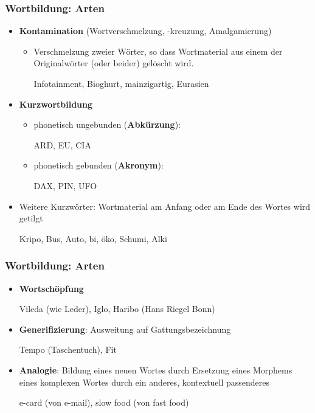 \begin{frame}
\frametitle{Wortbildung: Arten}

\begin{itemize}
	\item \textbf{Kontamination} (Wortverschmelzung, -kreuzung, Amalgamierung)
	
	\begin{itemize}
		\item Verschmelzung zweier Wörter, so dass Wortmaterial aus einem der Originalwörter (oder beider) gelöscht wird.
		
		\ea Infotainment, Bioghurt, mainzigartig, Eurasien
		\z
		
	\end{itemize}
	
	\item \textbf{Kurzwortbildung}
	
	\begin{itemize}
		\item phonetisch ungebunden (\textbf{Abkürzung}):
		
		\ea ARD, EU, CIA
		\z
		
		\item phonetisch gebunden (\textbf{Akronym}):
		
		\ea DAX, PIN, UFO
		\z
				
	\end{itemize}
	
	\item Weitere Kurzwörter: Wortmaterial am Anfang oder am Ende des Wortes wird getilgt
	
	\ea Kripo, Bus, Auto, bi, öko, Schumi, Alki
	\z
	
\end{itemize}
\end{frame}


\begin{frame}
\frametitle{Wortbildung: Arten}

\begin{itemize}
	\item \textbf{Wortschöpfung}
	
	\ea Vileda (wie Leder), Iglo, Haribo (Hans Riegel Bonn)
	\z
	
	\item \textbf{Generifizierung}: Ausweitung auf Gattungsbezeichnung
	
	\ea Tempo (Taschentuch), Fit
	\z
	
	\item \textbf{Analogie}: Bildung eines neuen Wortes durch Ersetzung eines Morphems eines komplexen Wortes durch ein anderes, kontextuell passenderes
	
	\ea e-card (von e-mail), slow food (von fast food)
	\z
	
\end{itemize}


\end{frame}


